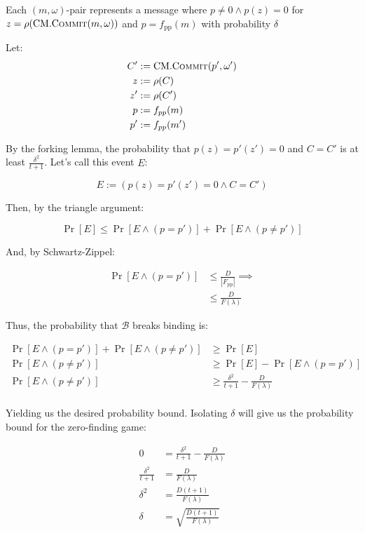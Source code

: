 \documentclass[
]{article}
\newcommand*\Bc{\mathcal{B}}
\renewcommand*\d{\delta}
\renewcommand*\o{\omega}
\newcommand*{\pp}{\mathrm{pp}}
\newcommand*{\Commit}{\mathrm{\text{C{\scriptsize OMMIT}}}}
\newcommand*{\CM}{\mathrm{\text{CM}}}
\newcommand*{\CMCommit}{\CM.\Commit}
\begin{document}
Each \((m, \o)\)-pair represents a message where
\(p \neq 0 \land p(z) = 0\) for \(z = \rho(\CMCommit(m, \o))\) and
\(p = f_\pp(m)\) with probability \(\d\)

Let: \[
\begin{aligned}
  C' &:= \CMCommit(p', \o') \\
  z  &:= \rho(C) \\
  z' &:= \rho(C') \\
  p  &:= f_{pp}(m) \\
  p' &:= f_{pp}(m')
\end{aligned}
\]

By the forking lemma, the probability that \(p(z) = p'(z') = 0\) and
\(C = C'\) is at least \(\frac{\d^2}{t + 1}\). Let's call this event
\(E\):

\[E := (p(z) = p'(z') = 0 \land C = C')\]

Then, by the triangle argument:

\[
\Pr[E] \leq \Pr[E \land (p = p')] + \Pr[E \land (p \neq p')]
\]

And, by Schwartz-Zippel:

\[
\begin{aligned}
\Pr[E \land (p = p')] &\leq \frac{D}{|F_\pp|} \implies \\
                      &\leq \frac{D}{F(\lambda)}
\end{aligned}
\]

Thus, the probability that \(\Bc\) breaks binding is:

\[
\begin{aligned}
\Pr[E \land (p = p')] + \Pr[E \land (p \neq p')] &\geq \Pr[E] \\
\Pr[E \land (p \neq p')] &\geq \Pr[E] - \Pr[E \land (p = p')] \\
\Pr[E \land (p \neq p')] &\geq \frac{\d^2}{t + 1} - \frac{D}{F(\lambda)} \\
\end{aligned}
\]

Yielding us the desired probability bound. Isolating \(\d\) will give us
the probability bound for the zero-finding game:

\[
\begin{aligned}
  0 &= \frac{\delta^2}{t + 1} - \frac{D}{F(\lambda)} \\
  \frac{\delta^2}{t + 1} &= \frac{D}{F(\lambda)} \\
  \delta^2 &= \frac{D(t + 1)}{F(\lambda)} \\
  \delta &= \sqrt{\frac{D(t + 1)}{F(\lambda)}}
\end{aligned}
\]
\end{document}
